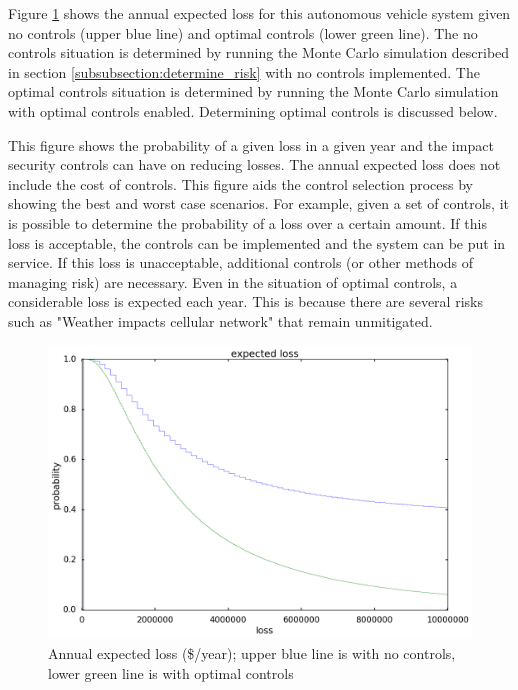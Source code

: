 \documentclass{article}
\begin{document}

Figure \ref{figure:ael} shows the annual expected loss for this autonomous vehicle system given no controls (upper blue line) and optimal controls (lower green line). The no controls situation is determined by running the Monte Carlo simulation described in section \ref{subsubsection:determine_risk} with no controls implemented. The optimal controls situation is determined by running the Monte Carlo simulation with optimal controls enabled. Determining optimal controls is discussed below.

This figure shows the probability of a given loss in a given year and the impact security controls can have on reducing losses. The annual expected loss does not include the cost of controls. This figure aids the control selection process by showing the best and worst case scenarios. For example, given a set of controls, it is possible to determine the probability of a loss over a certain amount. If this loss is acceptable, the controls can be implemented and the system can be put in service. If this loss is unacceptable, additional controls (or other methods of managing risk) are necessary. Even in the situation of optimal controls, a considerable loss is expected each year. This is because there are several risks such as "Weather impacts cellular network" that remain unmitigated.

\begin{figure}[h] \centering
    \includegraphics[width=\textwidth]{images/ael.png}
    \caption{Annual expected loss (\$/year); upper blue line is with no controls, lower green line is with optimal controls}
    \label{figure:ael}
\end{figure}
\end{document}
